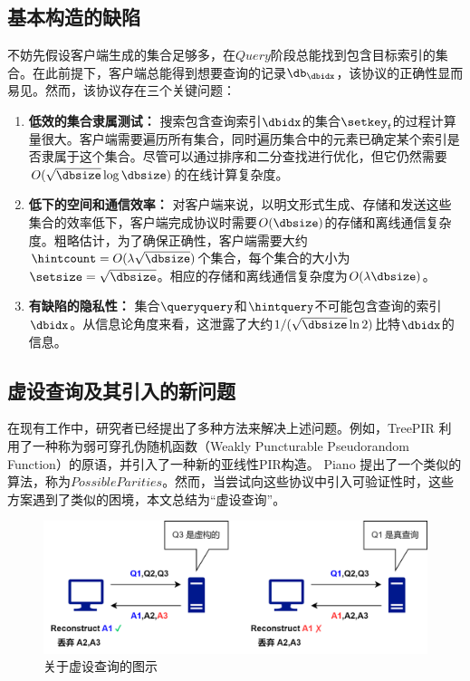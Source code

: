 \subsection{基本构造的缺陷}
不妨先假设客户端生成的集合足够多，在$Query$阶段总能找到包含目标索引的集合。在此前提下，客户端总能得到想要查询的记录$\db_\dbidx$，该协议的正确性显而易见。然而，该协议存在三个关键问题：

\begin{enumerate}
\item \textbf{低效的集合隶属测试：} 搜索包含查询索引$\dbidx$的集合$\setkey_t$的过程计算量很大。客户端需要遍历所有集合，同时遍历集合中的元素已确定某个索引是否隶属于这个集合。尽管可以通过排序和二分查找进行优化，但它仍然需要$O(\sqrt{\dbsize}\log \dbsize)$的在线计算复杂度。
\item \textbf{低下的空间和通信效率：} 对客户端来说，以明文形式生成、存储和发送这些集合的效率低下，客户端完成协议时需要$O(\dbsize)$的存储和离线通信复杂度。粗略估计，为了确保正确性，客户端需要大约$\hintcount = O(\lambda\sqrt{\dbsize})$个集合，每个集合的大小为$\setsize = \sqrt{\dbsize}$。相应的存储和离线通信复杂度为$O(\lambda\dbsize)$。
\item \textbf{有缺陷的隐私性：} 集合$\queryquery$和$\hintquery$不可能包含查询的索引$\dbidx$。从信息论角度来看，这泄露了大约$1/(\sqrt{\dbsize}\ln 2)$比特$\dbidx$的信息。
\end{enumerate}

\subsection{虚设查询及其引入的新问题}
在现有工作中，研究者已经提出了多种方法来解决上述问题。例如，TreePIR \cite{C:LazPap23} 利用了一种称为弱可穿孔伪随机函数（Weakly Puncturable Pseudorandom Function）的原语，并引入了一种新的亚线性PIR构造。 Piano \cite{Piano} 提出了一个类似的算法，称为$PossibleParities$。然而，当尝试向这些协议中引入可验证性时，这些方案遇到了类似的困境，本文总结为“虚设查询”。

\begin{figure}
    \centering
    \includegraphics[width=1\linewidth]{figure/dummy.png}
    \caption{关于虚设查询的图示}
    \label{fig:dummy}
\end{figure}

